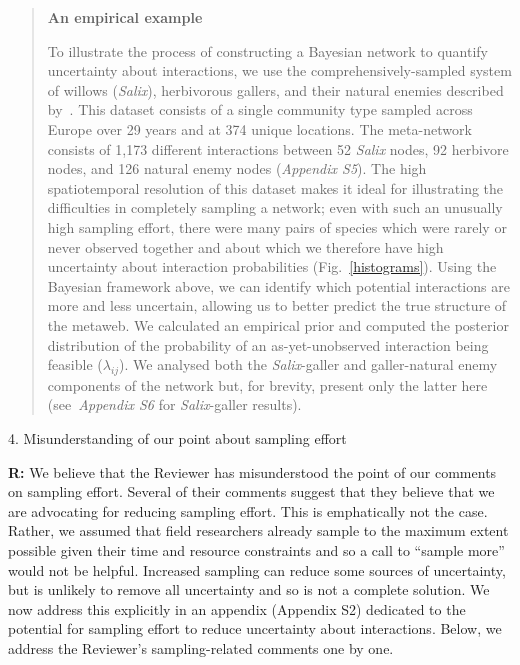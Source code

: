 \documentclass[12pt]{letter}
\begin{document}
		\begin{quotation}
		  \textbf{An empirical example}

		      To illustrate the process of constructing a Bayesian network to quantify uncertainty about interactions, we use the comprehensively-sampled system of willows (\emph{Salix}), herbivorous gallers, and their natural enemies described by~\citet{Kopelke2017}. This dataset consists of a single community type sampled across Europe over 29 years and at 374 unique locations. The meta-network consists of 1,173 different interactions between 52 \emph{Salix} nodes, 92 herbivore nodes, and 126 natural enemy nodes (\emph{Appendix S5}). 
		      The high spatiotemporal resolution of this dataset makes it ideal for illustrating the difficulties in completely sampling a network; even with such an unusually high sampling effort, there were many pairs of species which were rarely or never observed together and about which we therefore have high uncertainty about interaction probabilities (Fig.~\ref{histograms}). Using the Bayesian framework above, we can identify which potential interactions are more and less uncertain, allowing us to better predict the true structure of the metaweb. 
		      We calculated an empirical prior and computed the posterior distribution of the probability of an as-yet-unobserved interaction being feasible ($\lambda_{ij}$). We analysed both the \emph{Salix}-galler and galler-natural enemy components of the network but, for brevity, present only the latter here (see~\emph{Appendix S6} for \emph{Salix}-galler results).
		\end{quotation}


	4. Misunderstanding of our point about sampling effort 


		\textbf{R:} We believe that the Reviewer has  misunderstood the point of our comments on sampling effort. Several of their comments suggest that they believe that we are advocating for reducing sampling effort. This is emphatically not the case. Rather, we assumed that field researchers already sample to the maximum extent possible given their time and resource constraints and so a call to ``sample more'' would not be helpful. Increased sampling can reduce some sources of uncertainty, but is unlikely to remove all uncertainty and so is not a complete solution. We now address this explicitly in an appendix (Appendix S2)  dedicated to the potential for sampling effort to reduce uncertainty about interactions. Below, we address the Reviewer's sampling-related comments one by one.
\end{document}
